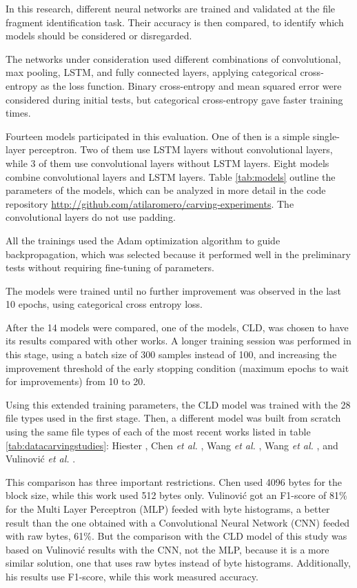 In this research, different neural networks are trained and validated
at the file fragment identification task. Their accuracy is then compared,
to identify which models should be considered or disregarded.

The networks under consideration used different combinations of convolutional, max pooling, LSTM, and fully connected layers,
applying categorical cross-entropy as the loss function. Binary cross-entropy and mean squared error were considered during initial tests, but categorical cross-entropy gave faster training times.

Fourteen models participated in this evaluation. One of then is a simple single-layer perceptron. Two of them use LSTM layers without convolutional layers, while 3 of them use convolutional layers without LSTM layers. Eight models combine convolutional layers and LSTM layers. Table \ref{tab:models} outline the parameters of the models, which can be analyzed in more detail in the code repository \sloppy\url{http://github.com/atilaromero/carving-experiments}. The convolutional layers do not use padding. 



All the trainings used the Adam \cite{kingma_adam:_2014}
optimization algorithm to guide backpropagation, which was selected because it performed well in the preliminary tests without requiring fine-tuning of parameters.

The models were trained until no further improvement was observed in the last 10 epochs, using categorical cross entropy loss.

After the 14 models were compared, one of the models, CLD, was chosen to have its results compared with other works. A longer training session was performed in this stage, using a batch size of 300 samples instead of 100, and increasing the improvement threshold of the early stopping condition (maximum epochs to wait for improvements) from 10 to 20.

Using this extended training parameters, the CLD model was trained with the 28 file types used in the first stage. Then, a different model was built from scratch using the same file types of each of the most recent works listed in table \ref{tab:datacarvingstudies}: 
Hiester \cite{hiester_file_2018}, 
Chen \textit{et al.} \cite{chen_file_2018},
Wang \textit{et al.} \cite{wang_sparse_2018},
Wang \textit{et al.} \cite{wang_file_2018},
and
Vulinović \textit{et al.} \cite{vulinovic_neural_2019}.

This comparison has three important restrictions.
Chen used 4096 bytes for the block size, while this work used 512 bytes only.
Vulinović got an F1-score of 81\% for the Multi Layer Perceptron (MLP) feeded with byte histograms, a better result than the one obtained with a Convolutional Neural Network (CNN) feeded with raw bytes, 61\%. But the comparison with the CLD model of this study was based on Vulinović results with the CNN, not the MLP, because it is a more similar solution, one that uses raw bytes instead of byte histograms. Additionally, his results use F1-score, while this work measured accuracy. 

